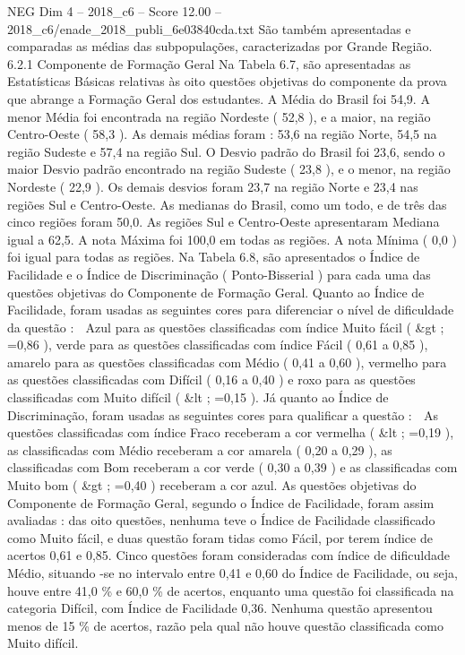 \begin{textsample}{NEG Dim 4 – 2018\_c6 – Score 12.00 – 2018\_c6/enade\_2018\_publi\_6e03840cda.txt}
São também apresentadas e comparadas as médias das subpopulações, caracterizadas por Grande Região. 6.2.1 Componente de Formação Geral Na Tabela 6.7, são apresentadas as Estatísticas Básicas relativas às oito questões objetivas do componente da prova que abrange a Formação Geral dos estudantes.
A Média do Brasil foi 54,9.
A menor Média foi encontrada na região Nordeste ( 52,8 ), e a maior, na região Centro-Oeste ( 58,3 ).
As demais médias foram : 53,6 na região Norte, 54,5 na região Sudeste e 57,4 na região Sul.
O Desvio padrão do Brasil foi 23,6, sendo o maior Desvio padrão encontrado na região Sudeste ( 23,8 ), e o menor, na região Nordeste ( 22,9 ).
Os demais desvios foram 23,7 na região Norte e 23,4 nas regiões Sul e Centro-Oeste.
As medianas do Brasil, como um todo, e de três das cinco regiões foram 50,0.
As regiões Sul e Centro-Oeste apresentaram Mediana igual a 62,5.
A nota Máxima foi 100,0 em todas as regiões.
A nota Mínima ( 0,0 ) foi igual para todas as regiões.
Na Tabela 6.8, são apresentados o Índice de Facilidade e o Índice de Discriminação ( Ponto-Bisserial ) para cada uma das questões objetivas do Componente de Formação Geral.
Quanto ao Índice de Facilidade, foram usadas as seguintes cores para diferenciar o nível de dificuldade da questão :  Azul para as questões classificadas com índice Muito fácil ( \&gt ; =0,86 ), verde para as questões classificadas com índice Fácil ( 0,61 a 0,85 ), amarelo para as questões classificadas com Médio ( 0,41 a 0,60 ), vermelho para as questões classificadas com Difícil ( 0,16 a 0,40 ) e roxo para as questões classificadas com Muito difícil ( \&lt ; =0,15 ).
Já quanto ao Índice de Discriminação, foram usadas as seguintes cores para qualificar a questão :  As questões classificadas com índice Fraco receberam a cor vermelha ( \&lt ; =0,19 ), as classificadas com Médio receberam a cor amarela ( 0,20 a 0,29 ), as classificadas com Bom receberam a cor verde ( 0,30 a 0,39 ) e as classificadas com Muito bom ( \&gt ; =0,40 ) receberam a cor azul.
As questões objetivas do Componente de Formação Geral, segundo o Índice de Facilidade, foram assim avaliadas : das oito questões, nenhuma teve o Índice de Facilidade classificado como Muito fácil, e duas questão foram tidas como Fácil, por terem índice de acertos 0,61 e 0,85.
Cinco questões foram consideradas com índice de dificuldade Médio, situando -se no intervalo entre 0,41 e 0,60 do Índice de Facilidade, ou seja, houve entre 41,0 \% e 60,0 \% de acertos, enquanto uma questão foi classificada na categoria Difícil, com Índice de Facilidade 0,36.
Nenhuma questão apresentou menos de 15 \% de acertos, razão pela qual não houve questão classificada como Muito difícil.

\end{textsample}
